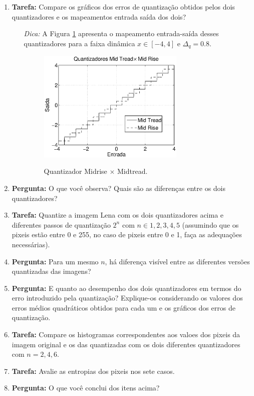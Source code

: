 \documentclass[11pt]{article}
\begin{document}
\begin{enumerate}

\item \textbf{Tarefa:} Compare os gráficos dos erros de quantização obtidos pelos dois quantizadores e os mapeamentos entrada saída dos dois?

\begin{itemize}
\item[\textit{Dica:}] A Figura \ref{fig:quants} apresenta o mapeamento entrada-saída desses quantizadores para a faixa dinâmica $x \in [-4,4]$ e $\Delta_q =0.8$.
\begin{figure}[h!]
\begin{center}
{\includegraphics[width=7cm]{./quants.eps}}
\caption{Quantizador Midrise $\times$ Midtread.}\label{fig:quants}
\end{center}
\end{figure}

\end{itemize}

\item \textbf{Pergunta:} O que você observa? Quais são as diferenças entre os dois quantizadores?

\item \textbf{Tarefa:} Quantize a imagem Lena com os dois quantizadores acima e diferentes passos de quantização $2^n$ com $n\in {1,2,3,4,5}$ (assumindo que os pixeis estão entre 0 e 255, no caso de pixeis entre 0 e 1, faça as adequações necessárias). 

\item \textbf{Pergunta:} Para um mesmo $n$, há diferença visível entre as diferentes versões quantizadas das imagens? 

\item \textbf{Pergunta:} E quanto ao desempenho dos dois quantizadores em termos do erro introduzido pela quantização? Explique-os considerando os valores dos erros médios quadráticos obtidos para cada um e os gráficos dos erros de quantização.

\item \textbf{Tarefa:} Compare os histogramas correspondentes aos valoes dos pixeis da imagem original e os das quantizadas com os dois diferentes quantizadores com $n={2,4,6}$. 

\item \textbf{Tarefa:} Avalie as entropias dos pixeis nos sete casos. 

\item \textbf{Pergunta:} O que você conclui dos itens acima?

\end{enumerate}
\end{document}
